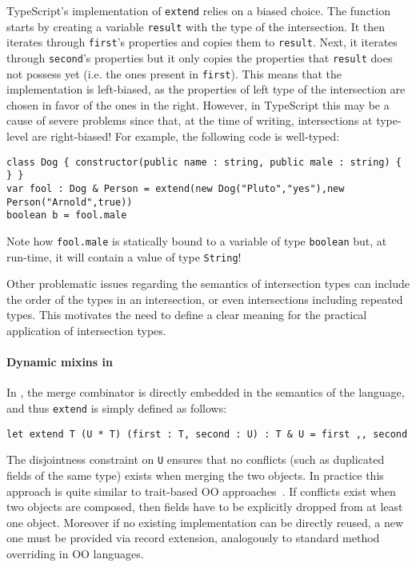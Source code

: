 TypeScript's implementation of \lstinline{extend} relies on a biased choice.
The function starts by creating a variable \lstinline$result$ with the type of the intersection. 
It then iterates through \lstinline$first$'s properties and copies them to 
\lstinline$result$.
Next, it iterates through \lstinline$second$'s properties but it only copies the properties
that \lstinline$result$ does not possess yet (i.e. the ones present in \lstinline$first$).
This means that the implementation is left-biased, as the properties of left type of the intersection
are chosen in favor of the ones in the right.
However, in TypeScript this may be a cause of severe problems since that, at the time of writing,
intersections at type-level are right-biased!
For example, the following code is well-typed:

\begin{lstlisting}
class Dog { constructor(public name : string, public male : string) { } }
var fool : Dog & Person = extend(new Dog("Pluto","yes"),new Person("Arnold",true))
boolean b = fool.male
\end{lstlisting}
Note how \lstinline$fool.male$ is statically bound to a variable of type \lstinline$boolean$ but, at run-time, 
it will contain a value of type \lstinline$String$! 

Other problematic issues regarding the semantics of intersection types can include the order of 
the types in an intersection, or even intersections including repeated types.
This motivates the need to define a clear meaning for the practical application of 
intersection types.

\paragraph{Dynamic mixins in \name}
In \name, the merge combinator is directly embedded in the semantics
of the language, and thus \lstinline{extend} is simply defined as
follows:

\begin{lstlisting}
let extend T (U * T) (first : T, second : U) : T & U = first ,, second 
\end{lstlisting}

\noindent The disjointness constraint on \lstinline{U} ensures that no
conflicts (such as duplicated fields of the same type) exists when merging the two objects. In practice this approach
is quite similar to trait-based OO approaches~\cite{scharli2003traits}. If conflicts
exist when two objects are composed, then fields have to be explicitly
dropped from at least one object. Moreover if no existing
implementation can be directly reused, a new one must be provided via
record extension, analogously to standard method overriding in OO
languages.

